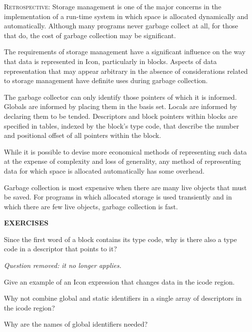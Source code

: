 \textsc{Retrospective}: Storage management is one of the major
concerns in the implementation of a run-time system in which space is
allocated dynamically and automatically. Although many programs never
garbage collect at all, for those that do, the cost of garbage
collection may be significant.

The requirements of storage management have a significant influence on
the way that data is represented in Icon, particularly in
blocks. Aspects of data representation that may appear arbitrary in
the absence of considerations related to storage management have
definite uses during garbage collection.

The garbage collector can only identify those pointers of which it is
informed. Globals are informed by placing them in the basis
set. Locals are informed by declaring them to be tended. Descriptors
and block pointers within blocks are specified in tables, indexed by
the block's type code, that describe the number and positional offset
of all pointers within the block.

While it is possible to devise more economical methods of representing
such data at the expense of complexity and loss of generality, any
method of representing data for which space is allocated automatically
has some overhead.

Garbage collection is most expensive when there are many live objects
that must be saved. For programs in which allocated storage is used
transiently and in which there are few live objects, garbage
collection is fast.

\bigskip

\noindent\textbf{EXERCISES}

Since the first word of a block contains its type
code, why is there also a type code in a descriptor that points to it?

{\em Question removed: it no longer applies.}

Give an example of an Icon expression that
changes data in the icode region.

Why not combine global and static identifiers in
a single array of descriptors in the icode region?

Why are the names of global identifiers needed?

